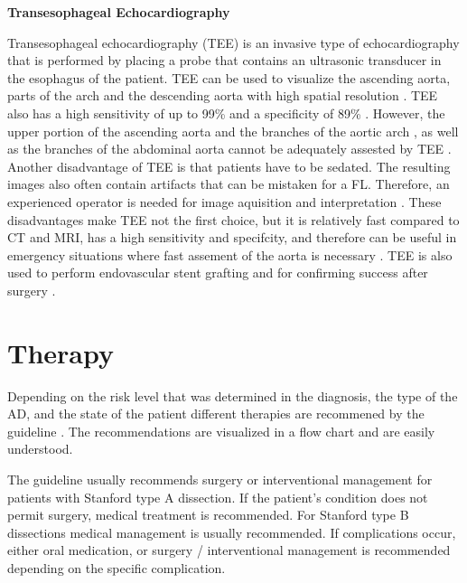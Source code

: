 \documentclass[thesis.tex]{subfiles}
\begin{document}
\textbf{Transesophageal Echocardiography}

Transesophageal echocardiography (TEE) is an invasive type of echocardiography that is performed by placing a probe that contains an ultrasonic transducer in the esophagus of the patient. TEE can be used to visualize the ascending aorta, parts of the arch and the descending aorta with high spatial resolution \cite{baliga2014role}. TEE also has a high sensitivity of up to 99\% and a specificity of 89\% \cite{baliga2014role}. However, the upper portion of the ascending aorta and the branches of the aortic arch \cite{shiga2006diagnostic,baliga2014role}, as well as the branches of the abdominal aorta cannot be adequately assested by TEE \cite{baliga2014role}. Another disadvantage of TEE is that patients have to be sedated. The resulting images also often contain artifacts that can be mistaken for a FL. Therefore, an experienced operator is needed for image aquisition and interpretation \cite{shiga2006diagnostic,baliga2014role}. These disadvantages make TEE not the first choice, but it is relatively fast compared to CT and MRI, has a high sensitivity and specifcity, and therefore can be useful in emergency situations where fast assement of the aorta is necessary \cite{shiga2006diagnostic,baliga2014role}. TEE is also used to perform endovascular stent grafting and for confirming success after surgery \cite{baliga2014role}. 


\section{Therapy} 

Depending on the risk level that was determined in the diagnosis, the type of the AD, and the state of the patient different therapies are recommened by the guideline \cite{hiratzka20102010}. The recommendations are visualized in a flow chart and are easily understood.

The guideline usually recommends surgery or interventional management for patients with Stanford type A dissection. If the patient's condition does not permit surgery, medical treatment is recommended. For Stanford type B dissections medical management is usually recommended. If complications occur, either oral medication, or surgery / interventional management is recommended depending on the specific complication. 
\end{document}
